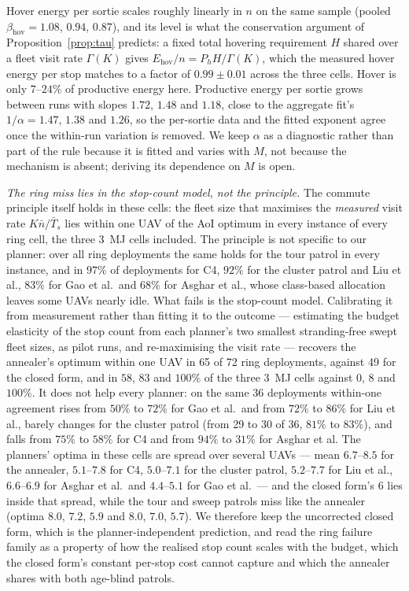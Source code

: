\documentclass[journal,outdir=./]{IEEEtran}
\newcommand{\Ph}{P_{h}}
\newcommand{\Gam}{\Gamma}
\begin{document}
Hover energy per sortie scales roughly linearly in $n$ on the same sample (pooled $\beta_{\mathrm{hov}}=1.08$, $0.94$, $0.87$), and its level is what the conservation argument of Proposition~\ref{prop:tau} predicts: a fixed total hovering requirement $H$ shared over a fleet visit rate $\Gam(K)$ gives $E_{\mathrm{hov}}/n=\Ph H/\Gam(K)$, which the measured hover energy per stop matches to a factor of $0.99\pm0.01$ across the three cells. Hover is only $7$--$24\%$ of productive energy here. Productive energy per sortie grows between runs with slopes $1.72$, $1.48$ and $1.18$, close to the aggregate fit's $1/\alpha=1.47$, $1.38$ and $1.26$, so the per-sortie data and the fitted exponent agree once the within-run variation is removed. We keep $\alpha$ as a diagnostic rather than part of the rule because it is fitted and varies with $M$, not because the mechanism is absent; deriving its dependence on $M$ is open.

\textit{The ring miss lies in the stop-count model, not the principle.} The commute principle itself holds in these cells: the fleet size that maximises the \emph{measured} visit rate $K\bar n/\bar T_s$ lies within one UAV of the AoI optimum in every instance of every ring cell, the three 3~MJ cells included. The principle is not specific to our planner: over all ring deployments the same holds for the tour patrol in every instance, and in $97\%$ of deployments for C4, $92\%$ for the cluster patrol and Liu et al., $83\%$ for Gao et al.\ and $68\%$ for Asghar et al., whose class-based allocation leaves some UAVs nearly idle. What fails is the stop-count model. Calibrating it from measurement rather than fitting it to the outcome --- estimating the budget elasticity of the stop count from each planner's two smallest stranding-free swept fleet sizes, as pilot runs, and re-maximising the visit rate --- recovers the annealer's optimum within one UAV in 65 of 72 ring deployments, against 49 for the closed form, and in $58$, $83$ and $100\%$ of the three 3~MJ cells against $0$, $8$ and $100\%$. It does not help every planner: on the same 36 deployments within-one agreement rises from $50\%$ to $72\%$ for Gao et al.\ and from $72\%$ to $86\%$ for Liu et al., barely changes for the cluster patrol (from 29 to 30 of 36, $81\%$ to $83\%$), and falls from $75\%$ to $58\%$ for C4 and from $94\%$ to $31\%$ for Asghar et al. The planners' optima in these cells are spread over several UAVs --- mean $6.7$--$8.5$ for the annealer, $5.1$--$7.8$ for C4, $5.0$--$7.1$ for the cluster patrol, $5.2$--$7.7$ for Liu et al., $6.6$--$6.9$ for Asghar et al.\ and $4.4$--$5.1$ for Gao et al.\ --- and the closed form's $6$ lies inside that spread, while the tour and sweep patrols miss like the annealer (optima $8.0$, $7.2$, $5.9$ and $8.0$, $7.0$, $5.7$). We therefore keep the uncorrected closed form, which is the planner-independent prediction, and read the ring failure family as a property of how the realised stop count scales with the budget, which the closed form's constant per-stop cost cannot capture and which the annealer shares with both age-blind patrols.
\end{document}
